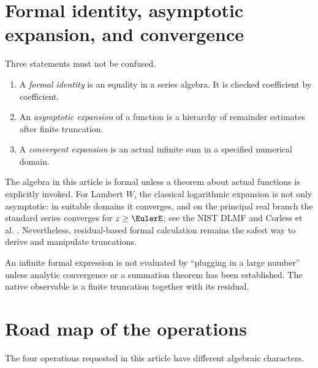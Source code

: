 \documentclass[11pt,openany]{book}
\theoremstyle{definition}
\theoremstyle{plain}
\theoremstyle{remark}
\begin{document}
\section{Formal identity, asymptotic expansion, and convergence}
Three statements must not be confused.

\begin{enumerate}
\item A \emph{formal identity} is an equality in a series algebra. It is checked coefficient by coefficient.
\item An \emph{asymptotic expansion} of a function is a hierarchy of remainder estimates after finite truncation.
\item A \emph{convergent expansion} is an actual infinite sum in a specified numerical domain.
\end{enumerate}

The algebra in this article is formal unless a theorem about actual functions is explicitly invoked. For Lambert \(W\), the classical logarithmic expansion is not only asymptotic: in suitable domains it converges, and on the principal real branch the standard series converges for \(z\ge \EulerE\); see the NIST DLMF and Corless et al. \cite{dlmf-W,corless-W}. Nevertheless, residual-based formal calculation remains the safest way to derive and manipulate truncations.

\begin{warningbox}
An infinite formal expression is not evaluated by ``plugging in a large number'' unless analytic convergence or a summation theorem has been established. The native observable is a finite truncation together with its residual.
\end{warningbox}

\section{Road map of the operations}
The four operations requested in this article have different algebraic characters.

\begin{center}
\end{center}
\end{document}
